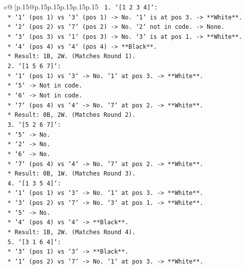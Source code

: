 \documentclass{article}
\begin{document}
{\begin{supertabular}{c@{$\;$}|p{.15\linewidth}@{}p{.15\linewidth}p{.15\linewidth}p{.15\linewidth}p{.15\linewidth}p{.15\linewidth}}
{{{\texttt{    1.  `{[}1 2 3 4{]}`:} \\
\texttt{        *   `1` (pos 1) vs `3` (pos 1) {-}> No. `1` is at pos 3. {-}> **White**.} \\
\texttt{        *   `2` (pos 2) vs `7` (pos 2) {-}> No. `2` not in code. {-}> None.} \\
\texttt{        *   `3` (pos 3) vs `1` (pos 3) {-}> No. `3` is at pos 1. {-}> **White**.} \\
\texttt{        *   `4` (pos 4) vs `4` (pos 4) {-}> **Black**.} \\
\texttt{        *   Result: 1B, 2W. (Matches Round 1).} \\
\texttt{    2.  `{[}1 5 6 7{]}`:} \\
\texttt{        *   `1` (pos 1) vs `3` {-}> No. `1` at pos 3. {-}> **White**.} \\
\texttt{        *   `5` {-}> Not in code.} \\
\texttt{        *   `6` {-}> Not in code.} \\
\texttt{        *   `7` (pos 4) vs `4` {-}> No. `7` at pos 2. {-}> **White**.} \\
\texttt{        *   Result: 0B, 2W. (Matches Round 2).} \\
\texttt{    3.  `{[}5 2 6 7{]}`:} \\
\texttt{        *   `5` {-}> No.} \\
\texttt{        *   `2` {-}> No.} \\
\texttt{        *   `6` {-}> No.} \\
\texttt{        *   `7` (pos 4) vs `4` {-}> No. `7` at pos 2. {-}> **White**.} \\
\texttt{        *   Result: 0B, 1W. (Matches Round 3).} \\
\texttt{    4.  `{[}1 3 5 4{]}`:} \\
\texttt{        *   `1` (pos 1) vs `3` {-}> No. `1` at pos 3. {-}> **White**.} \\
\texttt{        *   `3` (pos 2) vs `7` {-}> No. `3` at pos 1. {-}> **White**.} \\
\texttt{        *   `5` {-}> No.} \\
\texttt{        *   `4` (pos 4) vs `4` {-}> **Black**.} \\
\texttt{        *   Result: 1B, 2W. (Matches Round 4).} \\
\texttt{    5.  `{[}3 1 6 4{]}`:} \\
\texttt{        *   `3` (pos 1) vs `3` {-}> **Black**.} \\
\texttt{        *   `1` (pos 2) vs `7` {-}> No. `1` at pos 3. {-}> **White**.} \\
}}}
\end{supertabular}}
\end{document}
